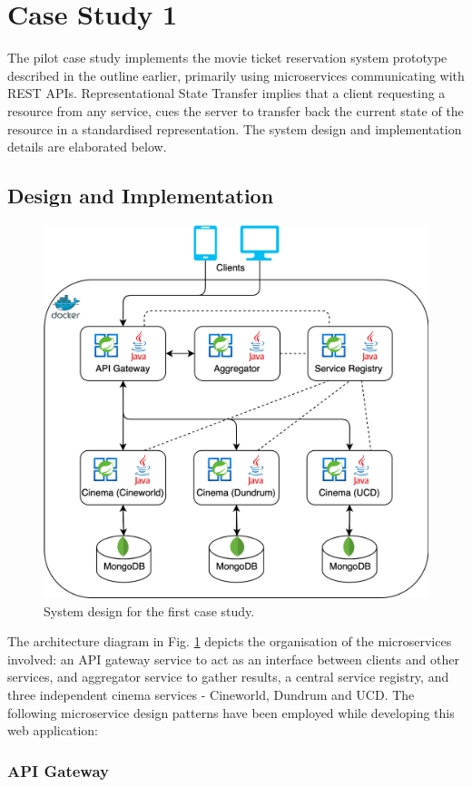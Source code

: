 \section{Case Study 1}

The pilot case study implements the movie ticket reservation system prototype described in the outline earlier, primarily using microservices communicating with REST APIs. Representational State Transfer implies that a client requesting a resource from any service, cues the server to transfer back the current state of the resource in a standardised representation. The system design and implementation details are elaborated below.

\subsection{Design and Implementation}

\begin{figure}[H]
  \centering
  \includegraphics[width=0.6\linewidth]{./assets/diagrams/cs01-arch.png}
  \caption{System design for the first case study.}
  \label{fig:cs01-arch}
\end{figure}

The architecture diagram in Fig. \ref{fig:cs01-arch} depicts the organisation of the microservices involved: an API gateway service to act as an interface between clients and other services, and aggregator service to gather results, a central service registry, and three independent cinema services - Cineworld, Dundrum and UCD. The following microservice design patterns have been employed while developing this web application:

\subsubsection{API Gateway}


